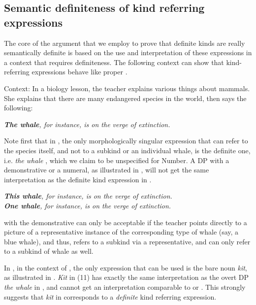 \documentclass[output=paper
,modfonts
,nonflat]{langsci/langscibook}
\begin{document}
	\subsection{Semantic definiteness of kind referring expressions} \label{sec:borik:3.1}
	
	The core of the argument that we employ to prove that  definite kinds are really semantically definite is based on the use and interpretation of these expressions in a context that requires definiteness. The following context can show that kind-referring expressions behave like proper . 
	
	\ea\label{ex:borik:9}
	Context: In a biology lesson, the teacher explains various things about mammals. She explains that there are many endangered species in the world, then says the following:
	
	\textit{\textbf{The whale}, for instance, is on the verge of extinction.}
	\z
	
	Note first that in , the only morphologically singular expression that can refer to the species itself, and not to a subkind or an individual whale, is the definite one, i.e. \textit{the whale} \citep{Jespersen1927}, which we claim to be unspecified for Number. A DP with a demonstrative or a numeral, as illustrated in , will not get the same interpretation as the definite kind expression in .
	
	\ea\label{ex:borik:10}
	\ea\label{ex:borik:10a}
	\textit{
		\textbf{This whale}, for instance, is on the verge of extinction. \\
	}
	\ex\label{ex:borik:10b}
	\textit{
		\textbf{One whale}, for instance, is on the verge of extinction.	
	}\z
	\z
	
	 with the demonstrative can only be acceptable if the teacher points directly to a picture of a representative instance of the corresponding type of whale (say, a blue whale), and thus, refers to a subkind via a representative, and  can only refer to a subkind of whale as well. 
	
	In , in the context of , the only expression that can be used is the bare noun \textit{kit}, as illustrated in . \textit{Kit} in (11) has exactly the same interpretation as the overt DP \textit{the whale} in , and cannot get an interpretation comparable to  or . This strongly suggests that \textit{kit} in  corresponds to a \textit{definite} kind referring expression.  
	
\end{document}
